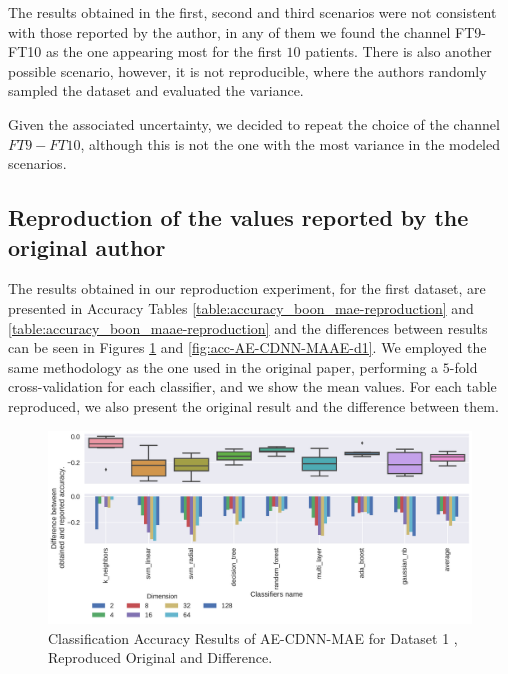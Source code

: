 The results obtained in the first, second and third scenarios were not consistent with those reported by the author, in any of them we found the channel FT9-FT10 as the one appearing most for the first $10$ patients. There is also another possible scenario, however, it is not reproducible, where the authors randomly sampled the dataset and evaluated the variance.

Given the associated uncertainty, we decided to repeat the choice of the channel $FT9-FT10$, although this is not the one with the most variance in the modeled scenarios.


\subsection{Reproduction of the values reported by the original author}

The results obtained in our reproduction experiment, for the first dataset, are presented in Accuracy Tables \ref{table:accuracy_boon_mae-reproduction} and \ref{table:accuracy_boon_maae-reproduction} and the differences between results can be seen in Figures \ref{fig:acc-AE-CDNN-MAE-d1} and \ref{fig:acc-AE-CDNN-MAAE-d1}. We employed the same methodology as the one used in the original paper, performing a $5$-fold cross-validation for each classifier, and we show the mean values. For each table reproduced, we also present the original result and the difference between them.







\begin{figure}[!ht]
  \centering
  \includegraphics[width=0.8\linewidth]{figure/table_2.pdf}
  \caption{Classification Accuracy Results of AE-CDNN-MAE for Dataset 1 \cite{WenZha:2018}, Reproduced Original and Difference.}
\label{fig:acc-AE-CDNN-MAE-d1}
\end{figure}

